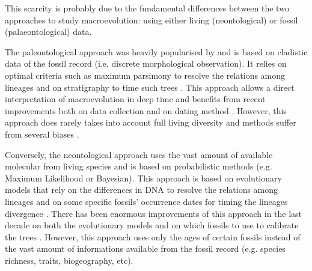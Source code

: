 
This scarcity %
is probably due to the fundamental differences between the two approaches to study macroevolution: using either living (neontological) or fossil (palaeontological) data.

The paleontological approach was heavily popularised by \cite{simpson1945} and is based on cladistic data of the fossil record (i.e. discrete morphological observation).
It relies on optimal criteria such as maximum parsimony \citep{Hennig1966,felsenstein2004} to resolve the relations among lineages and on stratigraphy to time such trees \citep{GoloboffTNT}.
This approach allows a direct interpretation of macroevolution in deep time and benefits from recent improvements both on data collection \citep[e.g. 4541 characters in][introducing the term ``phenomics'']{O'Leary08022013} and on dating method \citep[e.g. the \textit{cal3} method from][]{Bapst2014}.
However, this approach does rarely takes into account full living diversity \citep[e.g. only 38 out of 351 living primates for 119 fossil in][]{ni2013oldest} and methods suffer from several biases \citep[e.g. parsimony;][]{wrightbayesian2014}.

Conversely, the neontological approach uses the vast amount of available molecular from living species and is based on probabilistic methods (e.g. Maximum Likelihood or Bayesian).
This approach is based on evolutionary models that rely on the differences in DNA to resolve the relations among lineages and on some specific fossils' occurrence dates for timing the lineages divergence \citep[i.e. the molecular clock;][]{zuckerkandl1965}.
There has been enormous improvements of this approach in the last decade on both the evolutionary models \citep[e.g.][]{bapsta2013,stadlerdating2013,heaththe2013} and on which fossils to use to calibrate the trees \citep{Donoghue2007424,Parham01032012}.
However, this approach uses only the ages of certain fossils instead of the vast amount of informations available from the fossil record (e.g. species richness, traits, biogeography, etc).


